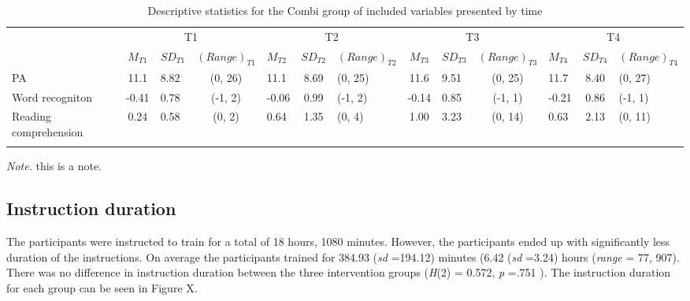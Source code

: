\documentclass[
  ,
]{article}
\begin{document}
\begin{table}[tbp]

\begin{center}
\begin{threeparttable}

\caption{\label{tab:desc-read-combi-table}Descriptive statistics for the Combi group of included variables presented by time}

\small{

\begin{tabular}{lclclclclclcl}
\toprule
 & \multicolumn{3}{c}{T1} & \multicolumn{3}{c}{T2} & \multicolumn{3}{c}{T3} & \multicolumn{3}{c}{T4} \\
\cmidrule(r){2-4} \cmidrule(r){5-7} \cmidrule(r){8-10} \cmidrule(r){11-13}
  & $M_{T1}$ & $SD_{T1}$ & $(Range)_{T1}$ & $M_{T2}$ & $SD_{T2}$ & $(Range)_{T2}$ & $M_{T3}$ & $SD_{T3}$ & $(Range)_{T3}$ & $M_{T4}$ & $SD_{T4}$ & $(Range)_{T4}$\\
\midrule
PA & 11.1 & 8.82 & (0, 26) & 11.1 & 8.69 & (0, 25) & 11.6 & 9.51 & (0, 25) & 11.7 & 8.40 & (0, 27)\\
Word recogniton & -0.41 & 0.78 & (-1, 2) & -0.06 & 0.99 & (-1, 2) & -0.14 & 0.85 & (-1, 1) & -0.21 & 0.86 & (-1, 1)\\
Reading comprehension & 0.24 & 0.58 & (0, 2) & 0.64 & 1.35 & (0, 4) & 1.00 & 3.23 & (0, 14) & 0.63 & 2.13 & (0, 11)\\
\bottomrule
\addlinespace
\end{tabular}

}

\begin{tablenotes}[para]
\normalsize{\textit{Note.} this is a note.}
\end{tablenotes}

\end{threeparttable}
\end{center}

\end{table}

\hypertarget{instruction-duration}{%
\subsection{Instruction duration}\label{instruction-duration}}

The participants were instructed to train for a total of 18 hours, 1080
minutes. However, the participants ended up with significantly less
duration of the instructions. On average the participants trained for
384.93 (\emph{sd} =194.12) minutes (6.42 (\emph{sd} =3.24) hours
(\emph{range} = 77, 907). There was no difference in instruction
duration between the three intervention groups (\emph{H}(2) = 0.572,
\emph{p} =.751 ). The instruction duration for each group can be seen in
Figure X.
\end{document}
